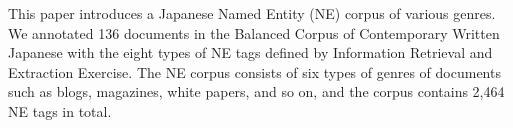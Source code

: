 This paper introduces a Japanese Named Entity (NE) corpus of various genres. We annotated 136 documents in the Balanced Corpus of Contemporary Written Japanese with the eight types of NE tags defined by Information Retrieval and Extraction Exercise. The NE corpus consists of six types of genres of documents such as blogs, magazines, white papers, and so on, and the corpus contains 2,464 NE tags in total.
